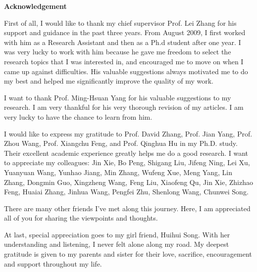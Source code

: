 
\Large\begin{center}
\textbf{Acknowledgement} \end{center}         \normalsize
First of all, I would like to thank my chief supervisor Prof. Lei Zhang for his support and guidance in the past three years. From August 2009, I first worked with him as a Research Assistant and then as a Ph.d student after one year. I was very lucky to work with him because he gave me freedom to select the research topics that I was interested in, and encouraged me to move on when I came up against difficulties. His valuable suggestions always motivated me to do my best and helped me significantly improve the quality of my work.

I want to thank Prof. Ming-Hsuan Yang for his valuable suggestions to my research. I am very thankful for his  very thorough revision of my articles. I am very lucky to have the chance to learn from him.

I would like to express my gratitude to Prof. David Zhang, Prof. Jian Yang, Prof. Zhou Wang, Prof. Xiangchu Feng, and Prof. Qinghua Hu in my Ph.D. study. Their excellent
academic experience greatly helps me do a good research. I want to appreciate my colleagues: Jin Xie, Bo Peng, Shigang Liu, Jifeng Ning, Lei Xu, Yuanyuan Wang, Yunhao Jiang, Min Zhang, Wufeng Xue, Meng Yang, Lin Zhang, Dongmin Guo, Xingzheng Wang, Feng Liu, Xiaofeng Qu, Jin Xie, Zhizhao Feng, Huaiai Zhang, Jinhua Wang, Pengfei Zhu, Shenlong Wang, Chunwei Song.

There are many other friends I've met along this journey. Here, I am appreciated all of you for sharing the viewpoints and thoughts.

At last, special appreciation goes to my girl friend, Huihui Song. With her understanding and listening, I never felt alone along my road. My deepest gratitude is given to my parents and sister for their
love, sacrifice, encouragement and support throughout my life. 